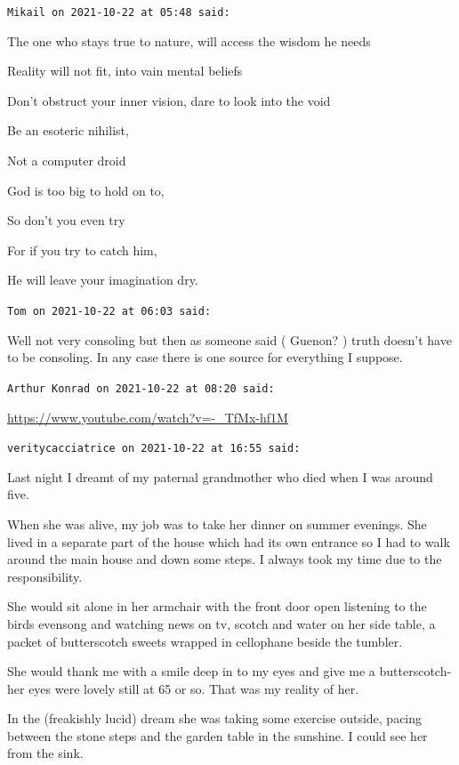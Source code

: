 \begin{footnotesize}
\begin{sffamily}
\texttt{Mikail on 2021-10-22 at 05:48 said:}

The one who stays true to nature, will access the wisdom he needs

Reality will not fit, into vain mental beliefs

Don't obstruct your inner vision, dare to look into the void

Be an esoteric nihilist,

Not a computer droid

God is too big to hold on to,

So don't you even try

For if you try to catch him,

He will leave your imagination dry.

\hfill

\texttt{Tom on 2021-10-22 at 06:03 said:}

Well not very consoling but then as someone said ( Guenon? ) truth doesn't have to be consoling. In any case there is one source for everything I suppose.

\hfill

\texttt{Arthur Konrad on 2021-10-22 at 08:20 said:}

\url{https://www.youtube.com/watch?v=-\_TfMx-hf1M}


\hfill

\texttt{veritycacciatrice on 2021-10-22 at 16:55 said:}

Last night I dreamt of my paternal grandmother who died when I was around five.

When she was alive, my job was to take her dinner on summer evenings. She lived in a separate part of the house which had its own entrance so I had to walk around the main house and down some steps. I always took my time due to the responsibility.

She would sit alone in her armchair with the front door open listening to the birds evensong and watching news on tv, scotch and water on her side table, a packet of butterscotch sweets wrapped in cellophane beside the tumbler.

She would thank me with a smile deep in to my eyes and give me a butterscotch- her eyes were lovely still at 65 or so. That was my reality of her.

In the (freakishly lucid) dream she was taking some exercise outside, pacing between the stone steps and the garden table in the sunshine. I could see her from the sink.


\end{sffamily}
\end{footnotesize}
